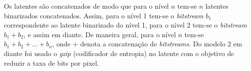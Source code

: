 Os latentes são concatenados de modo que para o nível $n$ tem-se $n$ latentes binarizados concatenados. Assim, para o nível 1 tem-se o \textit{bitstream} $b_1$ correspondente ao latente binarizado do nível 1, para o nível 2 tem-se o \textit{bitstream} $b_1 + b_2$, e assim em diante. De maneira geral, para o nível $n$ tem-se $b_1 + b_2 + \dots + b_n$, onde $+$ denota a concatenação de \textit{bitstreams}. 
Do modelo 2 em diante foi usado o \textit{gzip} (codificador de entropia) no latente com o objetivo de reduzir a taxa de bits por pixel.
